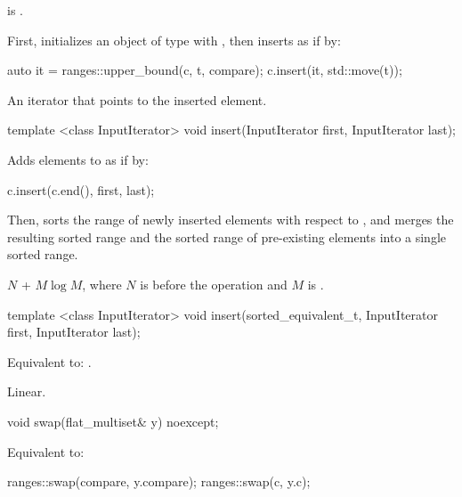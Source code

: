 \begin{addedblock}
\begin{itemdescr}
\pnum \constraints {} is .

\pnum
\effects
First, initializes an object  of type 
with , then inserts  as if by:
\begin{codeblock}
auto it = ranges::upper_bound(c, t, compare);
c.insert(it, std::move(t));
\end{codeblock}

\pnum
\returns
An iterator that points to the inserted element.
\end{itemdescr}

%
\begin{itemdecl}
template <class InputIterator>
  void insert(InputIterator first, InputIterator last);
\end{itemdecl}

\begin{itemdescr}
\pnum
\effects Adds elements to  as if by:
\begin{codeblock}
c.insert(c.end(), first, last);
\end{codeblock}
Then, sorts the range of newly inserted elements with respect to ,
and merges the resulting sorted range and the sorted range of pre-existing
elements into a single sorted range.

\pnum
\complexity
$N$ + $M \log M$, where $N$ is  before the operation and $M$
is .
\end{itemdescr}

%
\begin{itemdecl}
template <class InputIterator>
  void insert(sorted_equivalent_t, InputIterator first, InputIterator last);
\end{itemdecl}

\begin{itemdescr}
\pnum \effects Equivalent to: .

\pnum \complexity Linear.
\end{itemdescr}

%
\begin{itemdecl}
void swap(flat_multiset& y) noexcept;
\end{itemdecl}

\begin{itemdescr}
\pnum \effects Equivalent to:
\begin{codeblock}
ranges::swap(compare, y.compare);
ranges::swap(c, y.c);
\end{codeblock}
\end{itemdescr}


\end{addedblock}
